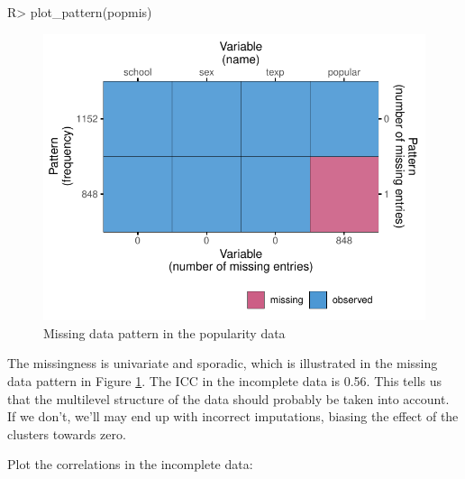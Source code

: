 \documentclass[
]{jss}
\begin{document}
\begin{CodeChunk}
\begin{CodeInput}
R> plot_pattern(popmis)
\end{CodeInput}
\begin{figure}

{\centering \includegraphics{Imputation_of_Incomplete_Multilevel_Data_files/figure-latex/pop_pat-1} 

}

\caption[Missing data pattern in the popularity data]{Missing data pattern in the popularity data}\label{fig:pop_pat}
\end{figure}
\end{CodeChunk}

The missingness is univariate and sporadic, which is illustrated in the
missing data pattern in Figure \ref{fig:pop_pat}. The ICC in the
incomplete data is 0.56. This tells us that the multilevel structure of
the data should probably be taken into account. If we don't, we'll may
end up with incorrect imputations, biasing the effect of the clusters
towards zero.

Plot the correlations in the incomplete data:
\end{document}
